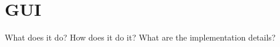 \documentclass[../00_main.tex]{subfiles}
\begin{document}
\section{GUI}

What does it do? How does it do it? What are the implementation details?
\end{document}
